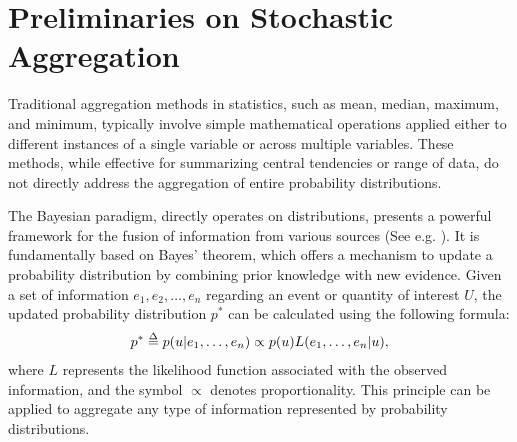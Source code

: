 \documentclass[letterpaper]{article} %
\theoremstyle{definition}
\theoremstyle{remark}
\def\delequal{\mathrel{\ensurestackMath{\stackon[1pt]{=}{\scriptstyle\Delta}}}}
\begin{document}
\section{Preliminaries on Stochastic Aggregation}

Traditional aggregation methods in statistics, such as mean, median, maximum, and minimum, typically involve simple mathematical operations applied either to different instances of a single variable or across multiple variables. These methods, while effective for summarizing central tendencies or range of data, do not directly address the aggregation of entire probability distributions. 

 
The Bayesian paradigm, directly operates on distributions, presents a powerful framework for the fusion of information from various sources (See e.g. \cite{clemen2007aggregating, sklar1996random}). It is fundamentally based on Bayes' theorem, which offers a mechanism to update a probability distribution by combining prior knowledge with new evidence. Given a set of information \( e_1, e_2, \ldots, e_n \) regarding an event or quantity of interest \(U\), the updated probability distribution \( p^* \) can be calculated using the following formula:
\begin{align}
\label{agg:bayes}
    p^* \delequal p(u | e_1, \ldots, e_n) \propto p(u) L(e_1, \ldots, e_n | u),
\end{align}
where \( L \) represents the likelihood function associated with the observed information, and the symbol $\propto$ denotes proportionality. This principle can be applied to aggregate any type of information represented by probability distributions. 
\end{document}
